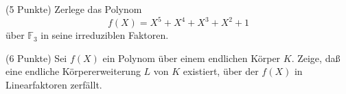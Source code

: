 \documentclass{algsheet}
\begin{document}
\begin{exercise}(5 Punkte)\newline
    Zerlege das Polynom    	
    \begin{equation}    
        f(X) = X^5 + X^4 + X^3 + X^2 + 1
    \end{equation}
    über \(\mathbb F_3\) in seine irreduziblen Faktoren.
\end{exercise}



\begin{exercise}(6 Punkte)\newline
    Sei \(f(X)\) ein Polynom über einem endlichen Körper \(K\). Zeige, daß eine
    endliche Körpererweiterung \(L\) von \(K\) existiert, über der \(f(X)\)
    in Linearfaktoren zerfällt.
\end{exercise}
\end{document}
